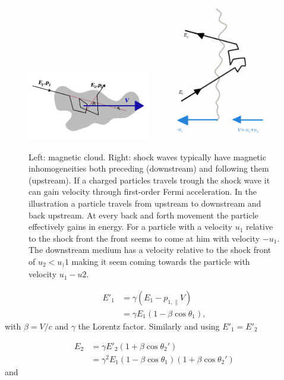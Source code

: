 \begin{figure}
\centering
\includegraphics[width=0.48\textwidth]{chapter3/img/cloud.png}
\includegraphics[width=0.48\textwidth]{chapter3/img/shock.png}
\caption{Left: magnetic cloud. Right: shock waves typically have magnetic inhomogeneities both preceding (downstream) and following them (upstream). If a charged particles travels trough the shock wave it can gain velocity through first-order Fermi acceleration. In the illustration a particle travels from upstream to downstream and back upstream. At every back and forth movement the particle effectively gains in energy. For a particle with a velocity $u_1$ relative to the shock front the front seems to come at him with velocity $-u_1$. The downstream medium has a velocity relative to the shock front of $u_2 < u_)1$ making it seem coming towards the particle with velocity $u_1-u2$.}
\label{fig:cloud}
\end{figure}

\begin{equation}
\begin{split}
E'_1 &= \gamma \left(E_1 - p_{1,\parallel} V\right) \\
&= \gamma E_1 \left(1-\beta \cos \theta_1\right),
\end{split}
\end{equation}
with $\beta = V/c$ and $\gamma$ the Lorentz factor. Similarly and using $E'_1 = E'_2$

\begin{equation}
\begin{split}
E_2 &= \gamma E'_2 \left(1+\beta \cos \theta_2'\right)\\
&=\gamma^2 E_1 \left(1-\beta \cos \theta_1\right) \left( 1 + \beta \cos \theta_2'\right)
\end{split}
\end{equation}
and

